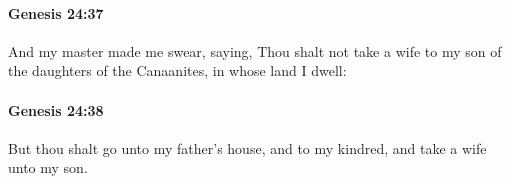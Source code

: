 		\paragraph{Genesis 24:37} %
			\label{GENESIS-24-37}

			And my master made me swear, saying, Thou shalt not take a wife to my son of the daughters of the Canaanites, in whose land I dwell:


		\paragraph{Genesis 24:38} %
			\label{GENESIS-24-38}

			But thou shalt go unto my father's house, and to my kindred, and take a wife unto my son.



